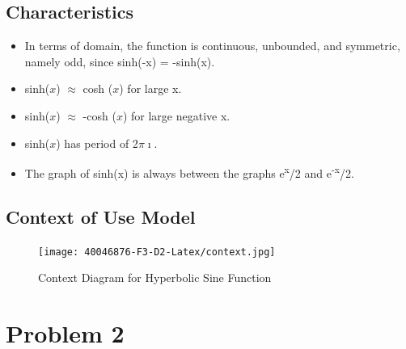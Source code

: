 \documentclass[
	12pt
]{article}
\begin{document}
\subsection{Characteristics}
\begin{itemize}
\item In terms of domain, the function is continuous, unbounded, and symmetric, namely odd, since sinh(-x) = -sinh(x).
\item sinh($x$) $\approx$ cosh ($x$) for large x.
\item sinh($x$) $\approx$  -cosh ($x$) for large negative x.
\item sinh($x$) has period of 2$\pi$$\imath$.
\item The graph of sinh(x) is always between the graphs e\textsuperscript{x}/2  and e\textsuperscript{-x}/2.
\end{itemize}

\subsection{Context of Use Model}
\begin{figure}[htp]
    \centering
    \texttt{[image: 40046876-F3-D2-Latex/context.jpg]}
    \caption{Context Diagram for Hyperbolic Sine Function}
    \label{sinh(x) graph}
\end{figure}

\section {Problem 2} 
\end{document}

